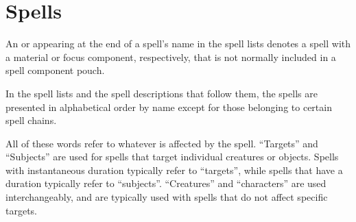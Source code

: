 \documentclass[twocolumn,oneside,letterpaper]{book} %
\begin{document}
\setcounter{chapter}{-1}
\tableofcontents






















\chapter{Spells}\label{Spells}

An \M{} or \F{} appearing at the end of a spell's name in the spell lists denotes a spell with a material or focus component, respectively, that is not normally included in a spell component pouch.

 In the spell lists and the spell descriptions that follow them, the spells are presented in alphabetical order by name except for those belonging to certain spell chains.

 All of these words refer to whatever is affected by the spell. ``Targets'' and ``Subjects'' are used for spells that target individual creatures or objects. Spells with instantaneous duration typically refer to ``targets'', while spells that have a duration typically refer to ``subjects''. ``Creatures'' and ``characters'' are used interchangeably, and are typically used with spells that do not affect specific targets.





\normalsize
\setlength\parindent{1em}
\appendix








\end{document}
